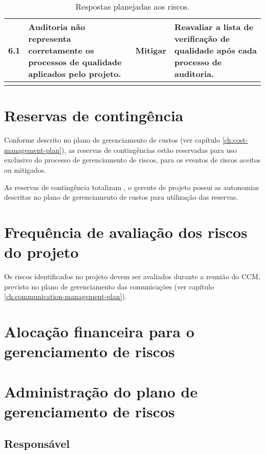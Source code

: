 \begin{longtable}{ c p{} c p{} }
	\midrule
	6.1                      & Auditoria não representa corretamente os processos de qualidade aplicados pelo projeto.                                                                                      & Mitigar                    & Reavaliar a lista de verificação de qualidade após cada processo de auditoria.                                                      \\
	\bottomrule
	\caption{Respostas planejadas aos riscos.}
	\centering
	\label{tab:risk-answers}
\end{longtable}

\section{Reservas de contingência}

Conforme descrito no plano de gerenciamento de custos (ver capítulo \ref{ch:cost-management-plan}), as reservas de contingências estão reservadas para uso exclusivo do processo de gerenciamento de riscos, para os eventos de riscos aceitos ou mitigados.

As reservas de contingência totalizam \contingencyBudget{} , o gerente de projeto possui as autonomias descritas no plano de gerenciamento de custos para utilização das reservas.

\section{Frequência de avaliação dos riscos do projeto}

Os riscos identificados no projeto devem ser avaliados durante a reunião do CCM, previsto no plano de gerenciamento das comunicações (ver capítulo \ref{ch:communication-management-plan}).

\section{Alocação financeira para o gerenciamento de riscos}

\section{Administração do plano de gerenciamento de riscos}

\subsection{Responsável}

